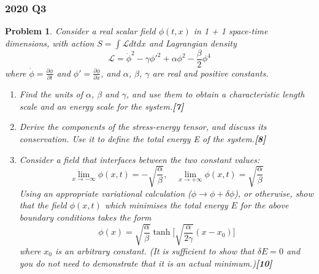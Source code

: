 \documentclass[a4paper]{article}
\theoremstyle{new}
\newtheorem{qns}{Problem}[section]
\begin{document}
\subsubsection*{2020 Q3}
\begin{qns}
Consider a real scalar field $\phi(t, x)$ in 1 + 1 space-time dimensions, with action $S=\int\mathcal{L}dtdx$ and Lagrangian density
$$\mathcal{L}=\dot{\phi}^2-\gamma\phi'^2+\alpha\phi^2-\frac{\beta}{2}\phi^4$$
where $\dot{\phi}=\frac{\partial\phi}{\partial t}$ and $\phi'=\frac{\partial\phi}{\partial x}$, and $\alpha$, $\beta$, $\gamma$ are real and positive constants.
\begin{enumerate}[label=(\alph*)]
\item Find the units of $\alpha$, $\beta$ and $\gamma$, and use them to obtain a characteristic length scale and an energy scale for the system.\hfill\textbf{[7]}
\item Derive the components of the stress-energy tensor, and discuss its conservation. Use it to define the total energy E of the system.\hfill\textbf{[8]}
\item Consider a field that interfaces between the two constant values:
$$\lim_{x\rightarrow-\infty}\phi(x,t)=-\sqrt{\frac{\alpha}{\beta}},\quad \lim_{x\rightarrow+\infty}\phi(x,t)=\sqrt{\frac{\alpha}{\beta}}$$
Using an appropriate variational calculation ($\phi\rightarrow\phi+\delta\phi$), or otherwise, show that the field $\phi(x, t)$ which minimises the total energy $E$ for the above boundary conditions takes the form
$$\phi(x)=\sqrt{\frac{\alpha}{\beta}}\tanh\bigg[\sqrt{\frac{\alpha}{2\gamma}}(x-x_0)\bigg]$$
where $x_0$ is an arbitrary constant. (It is sufficient to show that $\delta E = 0$ and you do not need to demonstrate that it is an actual minimum.)\hfill\textbf{[10]}
\end{enumerate}
\end{qns}
\end{document}
